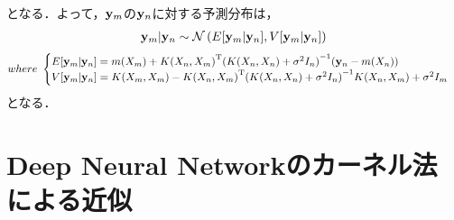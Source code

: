 \documentclass[11pt,a4j]{article}
\begin{document}
      となる．よって，${\bf y}_m$の${\bf y}_n$に対する予測分布は，
      \begin{align}
        {\bf y}_m | {\bf y}_n \sim \mathcal{N}\left( E[{\bf y}_m | {\bf y}_n], V[{\bf y}_m | {\bf y}_n] \right) 
      \end{align}
      \begin{align}          
        where ~ 
        \begin{cases}
          E[{\bf y}_m | {\bf y}_n] = m(X_m) + {K(X_n,X_m)}^{\mathrm{T}} {( K(X_n,X_n) + \sigma^2 I_n )} ^{-1} ( {\bf y}_n - m(X_n) ) \\
          V[{\bf y}_m | {\bf y}_n] = K(X_m,X_m) - {K(X_n,X_m)}^{\mathrm{T}} { ( K(X_n,X_n) + \sigma^2 I_n ) }^{-1} K(X_n,X_m) + \sigma^2 I_m
        \end{cases} \nonumber
      \end{align}
      となる．

      
  \section{Deep Neural Networkのカーネル法による近似}
\end{document}
